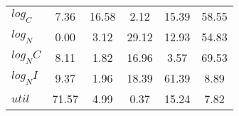 \begin{center}
\begin{longtable}{lccccc}
$log_C         $	 & 	        7.36	 & 	       16.58	 & 	        2.12	 & 	       15.39	 & 	       58.55 \\ 
$log_N         $	 & 	        0.00	 & 	        3.12	 & 	       29.12	 & 	       12.93	 & 	       54.83 \\ 
$log_NC        $	 & 	        8.11	 & 	        1.82	 & 	       16.96	 & 	        3.57	 & 	       69.53 \\ 
$log_NI        $	 & 	        9.37	 & 	        1.96	 & 	       18.39	 & 	       61.39	 & 	        8.89 \\ 
$util          $	 & 	       71.57	 & 	        4.99	 & 	        0.37	 & 	       15.24	 & 	        7.82 \\ 
\end{longtable}
 \end{center}

